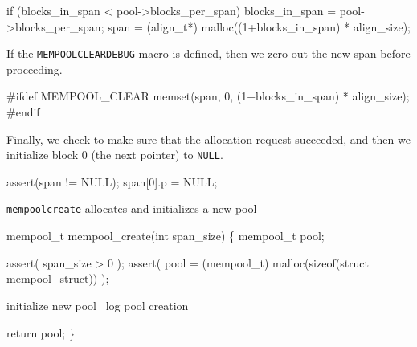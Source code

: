 \nwenddocs{}\endmoddef
if (blocks_in_span < pool->blocks_per_span)
    blocks_in_span = pool->blocks_per_span;
span = (align_t*) malloc((1+blocks_in_span) * align_size);
\nwendcode{}\nwdocspar

If the {\tt{}MEMPOOL{}CLEAR{}DEBUG} macro is defined, then we zero out
the new span before proceeding.

\nwenddocs{}\endmoddef
#ifdef MEMPOOL_CLEAR
memset(span, 0, (1+blocks_in_span) * align_size);
#endif
\nwendcode{}\nwdocspar

Finally, we check to make sure that the allocation request succeeded,
and then we initialize block 0 (the next pointer) to {\tt{}NULL}.

\nwenddocs{}\endmoddef
assert(span != NULL);
span[0].p = NULL;
\nwendcode{}\nwdocspar

{\tt{}mempool{}create} allocates and initializes a new pool

\nwenddocs{}\endmoddef
mempool_t mempool_create(int span_size)
\{
    mempool_t pool;

    assert( span_size > 0 );
    assert( pool = (mempool_t) malloc(sizeof(struct mempool_struct)) );

    \LA{}initialize new pool~{\nwtagstyle{}}\RA{}
    \LA{}log pool creation~{\nwtagstyle{}}\RA{}

    return pool;
\}

\nwendcode{}\nwdocspar

